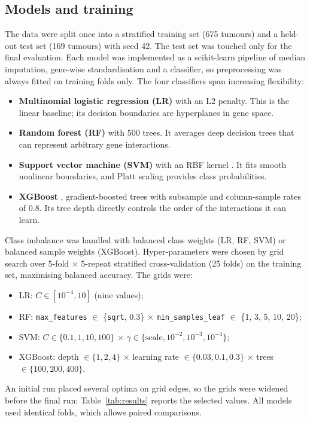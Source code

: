 \documentclass[10pt,twocolumn]{article}
\begin{document}
\subsection{Models and training}
The data were split once into a stratified training set (675 tumours) and a held-out test set (169 tumours) with seed 42. The test set was touched only for the final evaluation. Each model was implemented as a scikit-learn \citep{pedregosa2011} pipeline of median imputation, gene-wise standardisation and a classifier, so preprocessing was always fitted on training folds only. The four classifiers span increasing flexibility:
\begin{itemize}
\item \textbf{Multinomial logistic regression (LR)} with an L2 penalty. This is the linear baseline; its decision boundaries are hyperplanes in gene space.
\item \textbf{Random forest (RF)} \citep{breiman2001} with 500 trees. It averages deep decision trees that can represent arbitrary gene interactions.
\item \textbf{Support vector machine (SVM)} with an RBF kernel \citep{cortes1995}. It fits smooth nonlinear boundaries, and Platt scaling provides class probabilities.
\item \textbf{XGBoost} \citep{chen2016}, gradient-boosted trees with subsample and column-sample rates of 0.8. Its tree depth directly controls the order of the interactions it can learn.
\end{itemize}
Class imbalance was handled with balanced class weights (LR, RF, SVM) or balanced sample weights (XGBoost). Hyper-parameters were chosen by grid search over 5-fold $\times$ 5-repeat stratified cross-validation (25 folds) on the training set, maximising balanced accuracy. The grids were:
\begin{itemize}
\item LR: $C\in[10^{-4},10]$ (nine values);
\item RF: \texttt{max\_features} $\in$ \{\texttt{sqrt}, 0.3\} $\times$ \texttt{min\_samples\_leaf} $\in$ \{1, 3, 5, 10, 20\};
\item SVM: $C\in\{0.1,1,10,100\}$ $\times$ $\gamma\in\{\text{scale},10^{-2},10^{-3},10^{-4}\}$;
\item XGBoost: depth $\in\{1,2,4\}$ $\times$ learning rate $\in\{0.03,0.1,0.3\}$ $\times$ trees $\in\{100,200,400\}$.
\end{itemize}
An initial run placed several optima on grid edges, so the grids were widened before the final run; Table~\ref{tab:results} reports the selected values. All models used identical folds, which allows paired comparisons.
\end{document}
